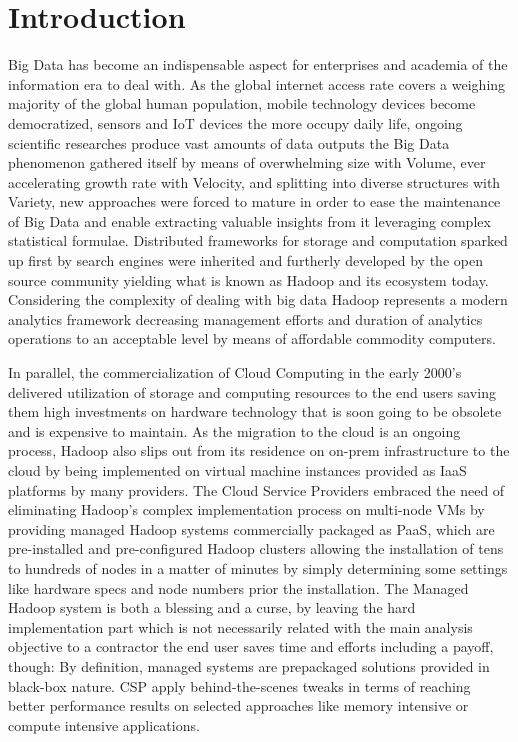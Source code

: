 \documentclass[review]{elsarticle}
\begin{document}
\linenumbers

\section{Introduction}

Big Data has become an indispensable aspect for enterprises and academia of the information era to deal with. As the global internet access rate covers a weighing majority of the global human population, mobile technology devices become democratized, sensors and IoT devices the more occupy daily life, ongoing scientific researches produce vast amounts of data outputs the Big Data phenomenon gathered itself by means of overwhelming size with Volume, ever accelerating growth rate with Velocity, and splitting into diverse structures with Variety, new approaches were forced to mature in order to ease the maintenance of Big Data and enable extracting valuable insights from it leveraging complex statistical formulae. Distributed frameworks for storage and computation sparked up first by search engines were inherited and furtherly developed by the open source community yielding what is known as Hadoop and its ecosystem today. Considering the complexity of dealing with big data Hadoop represents a modern analytics framework decreasing management efforts and duration of analytics operations to an acceptable level by means of affordable commodity computers.

In parallel, the commercialization of Cloud Computing in the early 2000's delivered utilization of storage and computing resources to the end users saving them high investments on hardware technology that is soon going to be obsolete and is expensive to maintain. As the migration to the cloud is an ongoing process, Hadoop also slips out from its residence on on-prem infrastructure to the cloud by being implemented on virtual machine instances provided as IaaS platforms by many providers. The Cloud Service Providers embraced the need of eliminating Hadoop's complex implementation process on multi-node VMs by providing managed Hadoop systems commercially packaged as PaaS, which are pre-installed and pre-configured Hadoop clusters allowing the installation of tens to hundreds of nodes in a matter of minutes by simply determining some settings like hardware specs and node numbers prior the installation. The Managed Hadoop system is both a blessing and a curse, by leaving the hard implementation part which is not necessarily related with the main analysis objective to a contractor the end user saves time and efforts including a payoff, though: By definition, managed systems are prepackaged solutions provided in black-box nature. CSP apply behind-the-scenes tweaks in terms of reaching better performance results on selected approaches like memory intensive or compute intensive applications.
\end{document}
